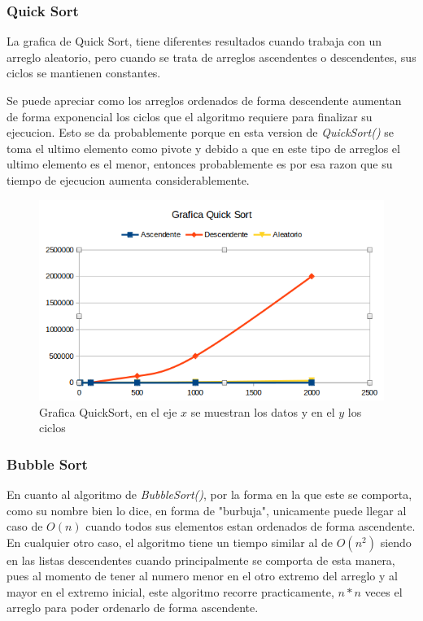 \documentclass{article}
\begin{document}
		\subsubsection{Quick Sort}
		
		La grafica de Quick Sort, tiene diferentes resultados cuando trabaja con un arreglo aleatorio, pero cuando se trata de arreglos ascendentes o descendentes, sus ciclos se mantienen constantes.
		
		Se puede apreciar como los arreglos ordenados de forma descendente aumentan de forma exponencial los ciclos que el algoritmo requiere para finalizar su ejecucion. Esto se da probablemente porque en esta version de \emph{QuickSort()} se toma el ultimo elemento como pivote y debido a que en este tipo de arreglos el ultimo elemento es el menor, entonces probablemente es por esa razon que su tiempo de ejecucion aumenta considerablemente. 
		
		\begin{figure}[H]
			\centering
			\includegraphics[scale = 0.75]{images/e4gqs.png}
			\caption{Grafica QuickSort, en el eje $x$ se muestran los datos y en el $y$ los ciclos}
		\end{figure}
	\newpage
		
		\subsubsection{Bubble Sort}
		
		En cuanto al algoritmo de \emph{BubbleSort()}, por la forma en la que este se comporta, como su nombre bien lo dice, en forma de "burbuja", unicamente puede llegar al caso de $O(n)$ cuando todos sus elementos estan ordenados de forma ascendente.\\
		
		En cualquier otro caso, el algoritmo tiene un tiempo similar al de $O(n^2)$ siendo en las listas descendentes cuando principalmente se comporta de esta manera, pues al momento de tener al numero menor en el otro extremo del arreglo y al mayor en el extremo inicial, este algoritmo recorre practicamente, $n * n$ veces el arreglo para poder ordenarlo de forma ascendente. \\ 
		
\end{document}
